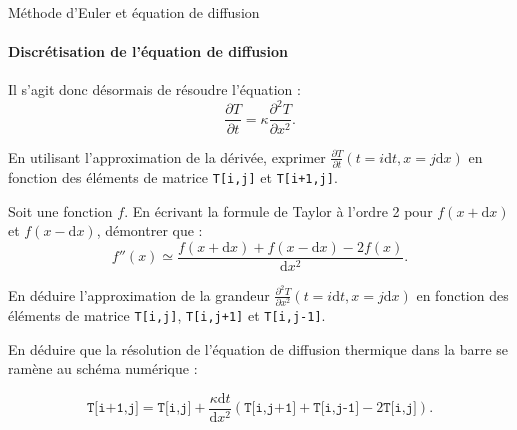 \begin{exo}[3][python]{Méthode d'Euler et équation de diffusion}
      \paragraph{Discrétisation de l'équation de diffusion}
      Il s'agit donc désormais de résoudre l'équation :
      $$\frac{\partial T}{\partial t} = \kappa \frac{\partial^2 T}{\partial x^2}.$$
      \begin{questions}
        \item En utilisant l'approximation de la dérivée, exprimer $\frac{\partial T}{\partial t}(t=i\mathrm{d}t,x=j\mathrm{d}x)$ en fonction des éléments de matrice \texttt{T[i,j]} et \texttt{T[i+1,j]}.
        \item Soit une fonction $f$. En écrivant la formule de Taylor à l’ordre 2 pour $f(x+\mathrm{d} x)$ et $f(x-\mathrm{d} x)$, démontrer que : 
        $$ f''(x)\simeq\frac{f(x+\mathrm{d} x)+f(x-\mathrm{d} x)-2f(x)}{\mathrm{d} x^2}.$$
        \item En déduire l'approximation de la grandeur $\frac{\partial^2 T}{\partial x^2}(t=i\mathrm{d}t,x=j\mathrm{d}x)$ en fonction des éléments de matrice \texttt{T[i,j]}, \texttt{T[i,j+1]} et  \texttt{T[i,j-1]}.
        \item En déduire que la résolution de l'équation de diffusion thermique dans la barre se ramène au schéma numérique :
        \begin{center}
          $$ \boxed{
            \texttt{T[i+1,j]}=\texttt{T[i,j]}+\frac{\kappa \mathrm{d}t}{\mathrm{d}x^2} \left( \texttt{T[i,j+1]}+\texttt{T[i,j-1]}-2\texttt{T[i,j]}\right).
            }$$
        \end{center}
      \end{questions}
    

\end{exo}
